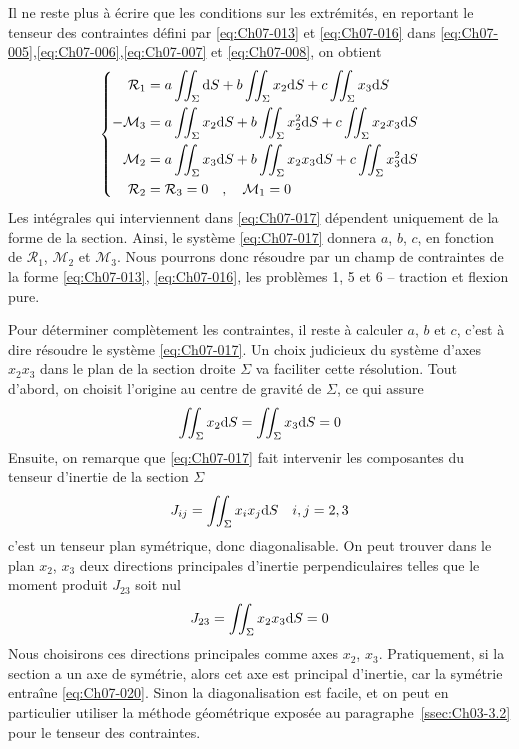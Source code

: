 Il ne reste plus à écrire que les conditions sur les extrémités, en reportant le tenseur des contraintes défini par \eqref{eq:Ch07-013} et \eqref{eq:Ch07-016} dans \eqref{eq:Ch07-005},\eqref{eq:Ch07-006},\eqref{eq:Ch07-007} et \eqref{eq:Ch07-008}, on obtient
\begin{equation}
    \left\{
    \begin{aligned}
        \mathcal{R}_1 &= a \iint_{\Sigma} \mathrm{d} S + b \iint_{\Sigma} x_2 \mathrm{d} S + c \iint_{\Sigma} x_3 \mathrm{d} S \\
        -\mathcal{M}_3 &= a \iint_{\Sigma} x_2\mathrm{d} S + b \iint_{\Sigma} x_2^2 \mathrm{d} S + c \iint_{\Sigma} x_2 x_3 \mathrm{d} S \\
        \mathcal{M}_2 &= a \iint_{\Sigma} x_3 \mathrm{d} S + b \iint_{\Sigma} x_2 x_3 \mathrm{d} S + c \iint_{\Sigma} x_3^2 \mathrm{d} S \\
        \mathcal{R}_2 &= \mathcal{R}_3 = 0 \quad, \quad \mathcal{M}_1 = 0
    \end{aligned}
    \right.
    \label{eq:Ch07-017}
\end{equation}
Les intégrales qui interviennent dans \eqref{eq:Ch07-017} dépendent uniquement de la forme de la section.
Ainsi, le système \eqref{eq:Ch07-017} donnera $a$, $b$, $c$, en fonction de $\mathcal{R}_1$, $\mathcal{M}_2$ et $\mathcal{M}_3$.
Nous pourrons donc résoudre par un champ de contraintes de la forme \eqref{eq:Ch07-013}, \eqref{eq:Ch07-016}, les problèmes 1, 5 et 6 -- traction et flexion pure.

Pour déterminer complètement les contraintes, il reste à calculer $a$, $b$ et $c$, c'est à dire résoudre le système \eqref{eq:Ch07-017}.
Un choix judicieux du système d'axes $x_2x_3$ dans le plan de la section droite $\Sigma$ va faciliter cette résolution.
Tout d'abord, on choisit l'origine au centre de gravité de $\Sigma$, ce qui assure
\begin{equation}
    \iint_{\Sigma} x_2 \mathrm{d} S = \iint_{\Sigma} x_3 \mathrm{d} S = 0
    \label{eq:Ch07-018}
\end{equation}
Ensuite, on remarque que \eqref{eq:Ch07-017} fait intervenir les composantes du tenseur d'inertie de la section $\Sigma$
\begin{equation}
    J_{ij} = \iint_{\Sigma} x_i x_j \mathrm{d} S \quad i,j = 2,3
    \label{eq:Ch07-019}
\end{equation}
c'est un tenseur plan symétrique, donc diagonalisable.
On peut trouver dans le plan $x_2$, $x_3$ deux directions principales d'inertie perpendiculaires telles que le moment produit $J_{23}$ soit nul
\begin{equation}
    J_{23} = \iint_{\Sigma} x_2 x_3 \mathrm{d} S = 0
    \label{eq:Ch07-020}
\end{equation}
Nous choisirons ces directions principales comme axes $x_2$, $x_3$.
Pratiquement, si la section a un axe de symétrie, alors cet axe est principal d'inertie, car la symétrie entraîne \eqref{eq:Ch07-020}.
Sinon la diagonalisation est facile, et on peut en particulier utiliser la méthode géométrique exposée au paragraphe~\ref{ssec:Ch03-3.2} pour le tenseur des contraintes.

